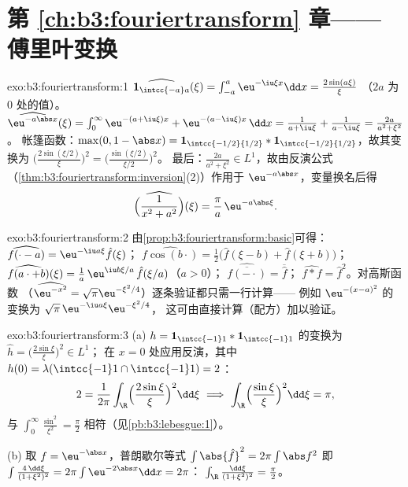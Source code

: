 \section*{第 \ref{ch:b3:fouriertransform} 章——
傅里叶变换}

\begin{solution}{exo:b3:fouriertransform:1}
$\widehat{\mathbf 1_{\intcc{-a}a}}(\xi) =
\int_{-a}^a\eu^{-\iu\xi x}\dd x = \frac{2\sin(a\xi)}{\xi}$
（$2a$ 为 $0$ 处的值）。
$\widehat{\eu^{-a\abs x}}(\xi) = \int_0^\infty\eu^{-(a +
\iu\xi)x} + \eu^{-(a - \iu\xi)x}\,\dd x = \frac1{a + \iu\xi} +
\frac1{a - \iu\xi} = \frac{2a}{a^2 + \xi^2}$。
帐篷函数：$\max(0, 1 - \abs x) = \mathbf 1_{\intcc{-1/2}{1/2}} *
\mathbf 1_{\intcc{-1/2}{1/2}}$，故其变换为
$\bigl(\frac{2\sin(\xi/2)}\xi\bigr)^2 =
\bigl(\frac{\sin(\xi/2)}{\xi/2}\bigr)^2$。
最后：$\frac{2a}{a^2+\xi^2} \in L^1$，故由反演公式
（\cref{thm:b3:fouriertransform:inversion}(2)）作用于
$\eu^{-a\abs x}$，变量换名后得
\[
\widehat{\Bigl(\frac1{x^2 + a^2}\Bigr)}(\xi) =
\frac{\pi}{a}\,\eu^{-a\abs\xi} .
\]
\end{solution}

\begin{solution}{exo:b3:fouriertransform:2}
由\cref{prop:b3:fouriertransform:basic}可得：
$\widehat{f(\cdot - a)} = \eu^{-\iu a\xi}\hat f(\xi)$；
$\widehat{f\cos(b\cdot)} = \frac12\bigl(\hat f(\xi - b) + \hat
f(\xi + b)\bigr)$；
$\widehat{f(a\cdot + b)}(\xi) = \frac1a\,\eu^{\iu
b\xi/a}\,\hat f(\xi/a)$（$a > 0$）；
$\widehat{\overline{f(-\cdot)}} = \overline{\hat f}$；
$\widehat{f * f} = \hat f^2$。对高斯函数
（$\widehat{\eu^{-x^2}} = \sqrt\pi\eu^{-\xi^2/4}$）逐条验证都只需一行计算——
例如 $\eu^{-(x-a)^2}$ 的变换为
$\sqrt\pi\,\eu^{-\iu a\xi}\eu^{-\xi^2/4}$，
这可由直接计算（配方）加以验证。
\end{solution}

\begin{solution}{exo:b3:fouriertransform:3}
(a) $h = \mathbf 1_{\intcc{-1}1}*\mathbf 1_{\intcc{-1}1}$ 的变换为
$\hat h = \bigl(\frac{2\sin\xi}\xi\bigr)^2 \in L^1$；
在 $x = 0$ 处应用反演，其中 $h(0) = \lambda(\intcc{-1}1\cap\intcc{-1}1)
= 2$：
\[
2 = \frac1{2\pi}\int_\R\Bigl(\frac{2\sin\xi}\xi\Bigr)^2
\dd\xi
\ \Longrightarrow\
\int_\R\Bigl(\frac{\sin\xi}\xi\Bigr)^2\dd\xi = \pi ,
\]
与 $\int_0^\infty\frac{\sin^2}{\xi^2} =
\frac\pi2$ 相符（见\cref{pb:b3:lebesgue:1}）。

(b) 取 $f = \eu^{-\abs x}$，普朗歇尔等式 $\int\abs{\hat f}^2 =
2\pi\int\abs f^2$ 即 $\int\frac{4\,\dd\xi}{(1 + \xi^2)^2} =
2\pi\int\eu^{-2\abs x}\dd x = 2\pi$：
$\int_\R\frac{\dd\xi}{(1+\xi^2)^2} = \frac\pi2$。
\end{solution}

